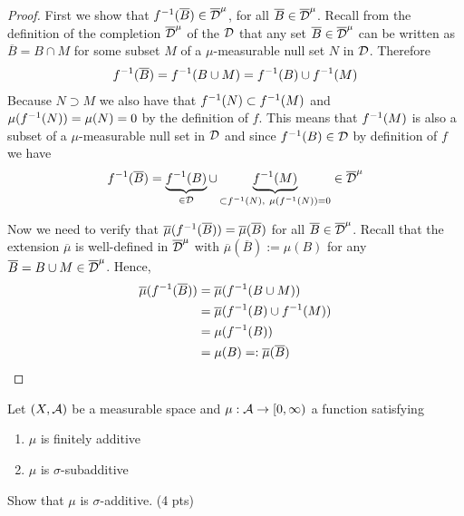 \begin{proof}
	First we show that ${f}^{-1}(\overline{B}) \in \overline{\mathcal{D}}^\mu$, for all $\overline{B} \in \overline{\mathcal{D}}^\mu$. Recall from the definition of the completion $\overline{\mathcal{D}}^\mu$ of the \siga $\mathcal{D}$ that any set $\overline{B} \in \overline{\mathcal{D}}^\mu$ can be written as $\overline{B} = B \cap M$ for some subset $M$ of a $\mu$-measurable null set $N$ in $\mathcal{D}$. Therefore
	\begin{align*}
		{f}^{-1}(\overline{B}) = {f}^{-1}(B \cup M) = {f}^{-1}(B) \cup {f}^{-1}(M)
	\end{align*}
	Because $N \supset M$ we also have that ${f}^{-1}(N) \subset {f}^{-1}(M)$ and $\mu({f}^{-1}(N)) = \mu(N) = 0$ by the definition of $f$. This means that ${f}^{-1}(M)$ is also a subset of a $\mu$-measurable null set in $\mathcal{D}$ and since ${f}^{-1}(B) \in \mathcal{D}$ by definition of $f$ we have
	\begin{align*}
		{f}^{-1}(\overline{B}) = \underbrace{{f}^{-1}(B)}_{\in \mathcal{D}} \cup \underbrace{{f}^{-1}(M)}_{\subset {f}^{-1}(N),\ \mu({f}^{-1}(N)) = 0} \in \overline{\mathcal{D}}^\mu
	\end{align*}
	
	Now we need to verify that $\overline{\mu}({f}^{-1}(\overline{B})) = \overline{\mu}(\overline{B})$ for all $\overline{B} \in \overline{\mathcal{D}}^\mu$. Recall that the extension $\overline{\mu}$ is well-defined in $\overline{\mathcal{D}}^\mu$ with $\overline{\mu}(\overline{B}) := \mu(B)$ for any $\overline{B} = B \cup M \in \overline{\mathcal{D}}^\mu$. Hence,
	\begin{align*}
		\overline{\mu}({f}^{-1}(\overline{B}))
		&= \overline{\mu}({f}^{-1}(B \cup M)) \\
		&= \overline{\mu}({f}^{-1}(B) \cup {f}^{-1}(M)) \\
		&= \mu({f}^{-1}(B)) \\
		&= \mu(B) =: \overline{\mu}(\overline{B})
	\end{align*}
\end{proof}

\begin{ex}
	Let $(X, \mathcal{A})$ be a measurable space and $\mu : \mathcal{A} \to [0, \infty)$ a function satisfying
	\begin{enumerate}
		\item $\mu$ is finitely additive
		\item $\mu$ is $\sigma$-subadditive
	\end{enumerate}
	Show that $\mu$ is $\sigma$-additive. (4 pts)
\end{ex}

